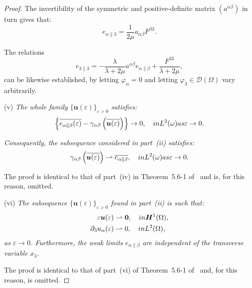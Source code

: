 \documentclass{amsart}
\begin{document}
\begin{proof}
The invertibility of the symmetric and positive-definite matrix $(a^{\alpha\beta})$ in turn gives that:
\begin{equation*}
		e_{\alpha\|3}=\dfrac{1}{2\mu} a_{\alpha\beta} F^{\beta3}.
\end{equation*}

The relations
\begin{equation*}
	e_{3\|3}=-\dfrac{\lambda}{\lambda+2\mu}a^{\alpha\beta}e_{\alpha\|\beta}+\dfrac{F^{33}}{\lambda+2\mu},
\end{equation*}
can be likewise established, by letting $\varphi_\alpha=0$ and letting $\varphi_3 \in \mathcal{D}(\Omega)$ vary arbitrarily.

(v) \emph{The whole family $\{\bm{u}(\varepsilon)\}_{\varepsilon>0}$ satisfies:}
\begin{equation*}
	\left\{\overline{e_{\alpha\|\beta}(\varepsilon)} - \gamma_{\alpha\beta}\left(\overline{\bm{u}(\varepsilon)}\right)\right\} \to 0,\quad\textup{ in }L^2(\omega) \textup{ as }\varepsilon\to 0.
\end{equation*}

\emph{Consequently, the subsequence considered in part~(ii) satisfies:}
\begin{equation*}
	\gamma_{\alpha\beta}\left(\overline{\bm{u}(\varepsilon)}\right) \rightharpoonup \overline{e_{\alpha\|\beta}},\quad\textup{ in }L^2(\omega) \textup{ as }\varepsilon\to 0.
\end{equation*}

The proof is identical to that of part~(iv) in Theorem~5.6-1 of~\cite{Ciarlet2000} and is, for this reason, omitted.

(vi) \emph{The subsequence $\{\bm{u}(\varepsilon)\}_{\varepsilon>0}$ found in part~(ii) is such that:}
\begin{equation*}
	\begin{aligned}
		\varepsilon\bm{u}(\varepsilon) &\rightharpoonup \bm{0},\quad\textup{ in }\bm{H}^1(\Omega),\\
		\partial_3u_\alpha(\varepsilon) &\rightharpoonup 0,\quad\textup{ in } L^2(\Omega),
	\end{aligned}
\end{equation*}
\emph{as $\varepsilon\to 0$. Furthermore, the weak limits $e_{\alpha\|\beta}$ are independent of the transverse variable $x_3$.}

The proof is identical to that of part~(vi) of Theorem~5.6-1 of~\cite{Ciarlet2000} and, for this reason, is omitted.


\end{proof}
\end{document}
